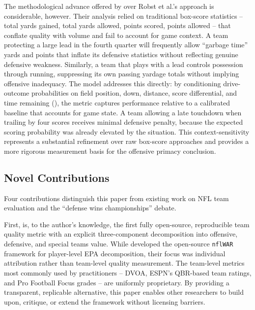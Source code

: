 The methodological advance offered by \gds{} over Robst et al.'s approach is
considerable, however. Their analysis relied on traditional box-score statistics
 -- total yards gained, total yards allowed, points scored, points allowed -- that
conflate quality with volume and fail to account for game context. A team
protecting a large lead in the fourth quarter will frequently allow ``garbage
time'' yards and points that inflate its defensive statistics without reflecting
genuine defensive weakness. Similarly, a team that plays with a lead controls
possession through running, suppressing its own passing yardage totals without
implying offensive inadequacy. The \xscore{} model addresses this directly:
by conditioning drive-outcome probabilities on field position, down, distance,
score differential, and time remaining (), the \xvoa{} metric
captures performance relative to a calibrated baseline that accounts for game
state. A team allowing a late touchdown when trailing by four scores receives
minimal defensive penalty, because the expected scoring probability was already
elevated by the situation. This context-sensitivity represents a substantial
refinement over raw box-score approaches and provides a more rigorous
measurement basis for the offensive primacy conclusion.

\subsection{Novel Contributions}
\label{sec:novel-contributions}

Four contributions distinguish this paper from existing work on NFL team
evaluation and the ``defense wins championships'' debate.

First, \gds{} is, to the author's knowledge, the first fully open-source,
reproducible team quality metric with an explicit three-component decomposition
into offensive, defensive, and special teams value. While
\textcite{yurko2019nflwar} developed the open-source \texttt{nflWAR} framework
for player-level EPA decomposition, their focus was individual attribution
rather than team-level quality measurement. The team-level metrics most commonly
used by practitioners -- DVOA, ESPN's QBR-based team ratings, and Pro Football
Focus grades -- are uniformly proprietary. By providing a transparent,
replicable alternative, this paper enables other researchers to build upon,
critique, or extend the framework without licensing barriers.

